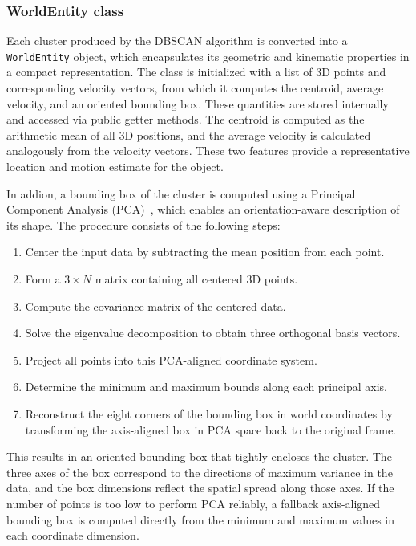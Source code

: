 \subsubsection{WorldEntity class}
\label{sec:WorldEntityClass}

Each cluster produced by the \gls{DBSCAN} algorithm is converted into a \texttt{WorldEntity}
object, which encapsulates its geometric and kinematic properties in a compact
representation. The class is initialized with a list of 3D points and corresponding
velocity vectors, from which it computes the centroid, average velocity, and an
oriented bounding box. These quantities are stored internally and accessed via public
getter methods. The centroid is computed as the arithmetic mean of all 3D positions,
and the average velocity is calculated analogously from the velocity vectors. These two
features provide a representative location and motion estimate for the object.

In addion, a bounding box of the cluster is computed using a Principal Component Analysis (PCA)~\Cite{pca_bounding_box}, which enables
an orientation-aware description of its shape. The procedure consists of the
following steps:

\begin{enumerate}
  \item Center the input data by subtracting the mean position from each point.
  \item Form a \( 3 \times N \) matrix containing all centered 3D points.
  \item Compute the covariance matrix of the centered data.
  \item Solve the eigenvalue decomposition to obtain three orthogonal basis vectors.
  \item Project all points into this PCA-aligned coordinate system.
  \item Determine the minimum and maximum bounds along each principal axis.
  \item Reconstruct the eight corners of the bounding box in world coordinates by
        transforming the axis-aligned box in PCA space back to the original frame.
\end{enumerate}

This results in an oriented bounding box that tightly encloses the cluster. The three
axes of the box correspond to the directions of maximum variance in the data, and the
box dimensions reflect the spatial spread along those axes. If the number of points is
too low to perform PCA reliably, a fallback axis-aligned bounding box is computed
directly from the minimum and maximum values in each coordinate dimension.

